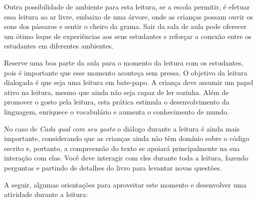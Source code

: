 \documentclass[11pt]{extarticle}
\begin{document}
Outra possibilidade de ambiente para esta leitura, se a escola permitir, 
é efetuar essa leitura ao ar livre, embaixo de uma árvore, onde as crianças 
possam ouvir os sons dos pássaros e sentir o cheiro da grama. Sair da sala 
de aula pode oferecer um ótimo leque de experiências aos seus estudantes e 
reforçar a conexão entre os estudantes em diferentes ambientes.  

Reserve uma boa parte da aula para o momento da leitura com os estudantes, 
pois é importante que esse momento aconteça sem pressa. O objetivo da 
leitura dialogada é que seja uma leitura em bate-papo. A criança deve 
assumir um papel ativo na leitura, mesmo que ainda não seja capaz de 
ler sozinha. Além de promover o gosto pela leitura, esta prática estimula 
o desenvolvimento da linguagem, enriquece o vocabulário e 
aumenta o conhecimento de mundo.

No caso de \textit{Cada qual com seu gosto} o diálogo durante a leitura é 
ainda mais importante, considerando que as crianças ainda não têm domínio sobre o código escrito e, portanto, a compreensão do texto se apoiará principalmente na sua interação com elas. 
Você deve interagir com eles durante toda a 
leitura, fazendo perguntas e partindo de detalhes do livro para 
levantar novas questões. 

A seguir, algumas orientações para aproveitar este momento e desenvolver uma atividade durante a leitura: 
\end{document}
